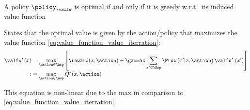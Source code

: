 \begin{theorembox}\nospacing
    \begin{theorem}\label{theorem:optimality_of_policies}
    A policy $\policy_{\valfu}$ is optimal if and only if it is greedy w.r.t.\ its induced value function
    \end{theorem}
\end{theorembox}
\begin{defnbox}\nospacing
  \begin{defn}\label{defn:non-linear_bellman_equation_optimal_value}
    States that the optimal value is given by the action/policy that maximizes the value function \cref{eq:value_function_value_iterration}:
    \begin{align}
      \valfu^{*}(x)&=
     \max_{\action\in\Asp}\left[\reward(x,\action)+\gammac\sum_{x'\in\Ssp}\Prob\left(x'|x,\action\right)\valfu^{*}\left(x'\right)\right]\\[-1\jot]
      :&=\max_{\action\in\Asp}Q^{*}(x,\action)
    \end{align}
  \end{defn}
\end{defnbox}
\begin{notebox}[Note]\nospacing
  This equation is non-linear due to the max in comparison to \cref{eq:value_function_value_iterration}.
\end{notebox}
